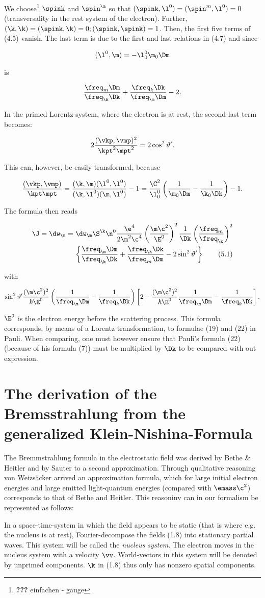 \documentclass{article}
\newcommand{\WTF}[1]{\footnote{\textbf{???} #1}}
\newcommand{\nequ}[2]{
\begin{align*}
#1
\tag{#2}
\end{align*}
}
\newcommand{\uequ}[1]{
\begin{align*}
#1
\end{align*}
}
\newcommand{\primed}[1]{{#1^{\prime}}}
\newcommand{\inv}[1]{\frac{1}{#1}}
\renewcommand{\it}[1]{\textit{#1}}
\begin{document}
We choose\WTF{einfachen - gauge} $\spink$ and $\spin^\m$ so that $(\spink,\l^0)=(\spin^m,\l^0)=0$ (transversality in the rest system of the electron). Further, $(\k,\k)=(\spink,\k)=0;(\spink,\spink)=1$. Then, the first five terms of (4.5) vanish. The last term is due to the first and last relations in (4.7) and since
\uequ{
(\l^0,\m)=-\l^0_0\m_0\Dm
}
is
\uequ{
\frac{\freq_m\Dm}{\freq_\k\Dk} + \frac{\freq_k\Dk}{\freq_\m\Dm} - 2.
}
In the primed Lorentz-system, where the electron is at rest, the second-last term becomes:
\uequ{
2\frac{(\vkp,\vmp)^2}{\kpt^2\mpt^2} = 2\cos^2\primed{\vartheta}.
}
This can, however, be easily transformed, because
\uequ{
\frac{(\vkp,\vmp)}{\kpt\mpt}=\frac{(\k,\m)(\l^0,\l^0)}{(\k,\l^0)(\m,\l^0)}-1
= \frac{\C^2}{\l^0_0}\left(\inv{\m_0\Dm}-\inv{\k_0\Dk}\right) - 1.
}
The formula then reads
\nequ{
\J = \dw_\m = \dw_\m \S^\k \n^0 \frac{\e^4}{2\m^2\c^4}
\left(\frac{\m\c^2}{\E^0}\right)^2\inv{\Dk}\left(\frac{\freq_m}{\freq_\k}\right)^2\\
\left\{
\frac{\freq_\m\Dm}{\freq_\k\Dk} + \frac{\freq_\k\Dk}{\freq_m\Dm} - 2\sin^2\primed{\vartheta}
\right\}
}{5.1}
with
\uequ{
\sin^2\primed{\vartheta} 
 \frac{(\m\c^2)^2}{\hbar\E^0}\left(
 \inv{\freq_\m\Dm} - \inv{\freq_k\Dk}
\right)\left[
2 - \frac{(\m\c^2)^2}{\hbar\E^0}
    \inv{\freq_\m\Dm} - \inv{\freq_k\Dk}
\right].}

$\E^0$ is the electron energy before the scattering process. This formula corresponds, by means of a Lorentz transformation, to formulae (19) and (22) in Pauli\cite{1}. When comparing, one must however ensure that Pauli's formula (22) (because of his formula (7)) must be multiplied by $\Dk$ to be compared with out expression.

\section{The derivation of the Bremsstrahlung from the generalized Klein-Nishina-Formula}

The Bremmstrahlung formula in the electrostatic field was derived by Bethe \& Heitler and by Sauter\cite{2} to a second approximation. Through qualitative reasoning von Weizsäcker\cite{3} arrived an approximation formula, which for large initial electron energies and large emitted light-quantum energies (compared with $\emass\c^2$) corresponds to that of Bethe and Heitler. This reasoninv can in our formalism be represented as follows:

In a space-time-system in which the field appears to be static (that is where e.g. the nucleus is at rest), Fourier-decompose the fields (1.8) into stationary partial waves. This system will be called the \it{nucleus system}. The electron moves in the nucleus system with a velocity $\vv$. World-vectors in this system will be denoted by unprimed components. $\k$ in (1.8) thus only has nonzero spatial components.
\end{document}
